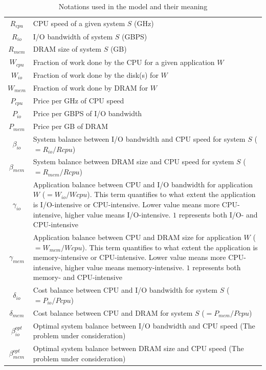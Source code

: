 \documentclass[journal]{IEEEtran}
\begin{document}
\begin{table}[!t]
\caption{Notations used in the model and their meaning}
\label{tab:Notation}
\centering
\begin{tabular}{|c|p{7cm}|}
\hline
$R_{cpu}$ & CPU speed of a given system $S$ (GHz)\\
$R_{io}$ &  I/O bandwidth of system $S$ (GBPS)\\
$R_{mem}$ & DRAM size of system $S$ (GB)\\
\hline
$W_{cpu}$ & Fraction of work done by the CPU for a given application $W$\\
$W_{io}$ & Fraction of work done by the disk(s) for $W$\\
$W_{mem}$ & Fraction of work done by DRAM for $W$\\
\hline
$P_{cpu}$ & Price per GHz of CPU speed\\
$P_{io}$ & Price per GBPS of I/O bandwidth\\
$P_{mem}$ & Price per GB of DRAM\\
\hline
\hline
$\beta_{io}$ & System balance between I/O bandwidth and CPU speed for system $S$ ($= R_{io}/R{cpu}$)\\
$\beta_{mem}$ & System balance between DRAM size and CPU speed for system $S$ ($= R_{mem}/R{cpu}$)\\
\hline
$\gamma_{io}$ & Application balance between CPU and I/O bandwidth for application $W$ ($= W_{io}/W{cpu}$). This term quantifies to what extent the application is I/O-intensive or CPU-intensive. Lower value means more CPU-intensive, higher value means I/O-intensive. $1$ represents both I/O- and CPU-intensive \\
$\gamma_{mem}$ & Application balance between CPU and DRAM size for application $W$ ($= W_{mem}/W{cpu}$). This term quantifies to what extent the application is memory-intensive or CPU-intensive. Lower value means more CPU-intensive, higher value means memory-intensive. $1$ represents both memory- and CPU-intensive \\
\hline
$\delta_{io}$ & Cost balance between CPU and I/O bandwidth for system $S$ ($= P_{io}/P{cpu}$)\\
$\delta_{mem}$ & Cost balance between CPU and DRAM for system $S$ ($= P_{mem}/P{cpu}$)\\
\hline
\hline
$\beta_{io}^{opt}$ & Optimal system balance between I/O bandwidth and CPU speed (The problem under consideration)\\
$\beta_{mem}^{opt}$ & Optimal system balance between DRAM size and CPU speed (The problem under consideration)\\
\hline
\end{tabular}
\end{table}
\end{document}
